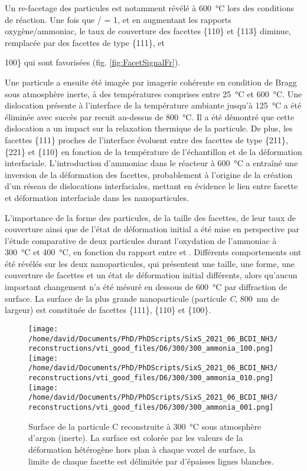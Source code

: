 Un re-facetage des particules est notamment révélé à \qty{600}{\degreeCelsius} lors des conditions de réaction.
Une fois que / = 1, et en augmentant les rapports oxygène/ammoniac, le taux de couverture des facettes \{110\} et \{113\} diminue, remplacée par des facettes de type \{111\}, et \ {100\} qui sont favorisées (fig. \ref{fig:FacetSignalFr}).

Une particule a ensuite été imagée par imagerie cohérente en condition de Bragg sous atmosphère inerte, à des températures comprises entre \qty{25}{\degreeCelsius} et \qty{600}{\degreeCelsius}.
Une dislocation présente à l'interface de la température ambiante jusqu'à \qty{125}{\degreeCelsius} a été éliminée avec succès par recuit au-dessus de \qty{800}{\degreeCelsius}.
Il a été démontré que cette dislocation a un impact sur la relaxation thermique de la particule.
De plus, les facettes \{111\} proches de l'interface évoluent entre des facettes de type \{211\}, \{221\} et \{110\} en fonction de la température de l'échantillon et de la déformation interfaciale.
L'introduction d'ammoniac dans le réacteur à \qty{600}{\degreeCelsius} a entraîné une inversion de la déformation des facettes, probablement à l'origine de la création d'un réseau de dislocations interfaciales, mettant en évidence le lien entre facette et déformation interfaciale dans les nanoparticules.

L'importance de la forme des particules, de la taille des facettes, de leur taux de couverture ainsi que de l'état de déformation initial a été mise en perspective par l'étude comparative de deux particules durant l'oxydation de l'ammoniac à \qty{300}{\degreeCelsius} et \qty{400}{\degreeCelsius}, en fonction du rapport entre  et .
Différents comportements ont été révélés sur les deux nanoparticules, qui présentent une taille, une forme, une couverture de facettes et un état de déformation initial différents, alors qu'aucun important changement n'a été mésuré en dessous de \qty{600}{\degreeCelsius} par diffraction de surface.
La surface de la plus grande nanoparticule (particule \textit{C}, \qty{800}{\nm} de largeur) est constituée de facettes \{111\}, \{110\} et \{100\}.

\begin{figure}[!htb]
    \centering
    \texttt{[image: /home/david/Documents/PhD/PhDScripts/SixS\_2021\_06\_BCDI\_NH3/reconstructions/vti\_good\_files/D6/300/300\_ammonia\_100.png]}
    \texttt{[image: /home/david/Documents/PhD/PhDScripts/SixS\_2021\_06\_BCDI\_NH3/reconstructions/vti\_good\_files/D6/300/300\_ammonia\_010.png]}
    \texttt{[image: /home/david/Documents/PhD/PhDScripts/SixS\_2021\_06\_BCDI\_NH3/reconstructions/vti\_good\_files/D6/300/300\_ammonia\_001.png]}
    \caption{
        Surface de la particule C reconstruite à \qty{300}{\degreeCelsius} sous atmosphère d'argon (inerte).
        La surface est colorée par les valeurs de la déformation hétérogène hors plan à chaque voxel de surface, la limite de chaque facette est délimitée par d'épaisses lignes blanches.
    }
    \label{fig:D6FacetsFr}
\end{figure}

}
